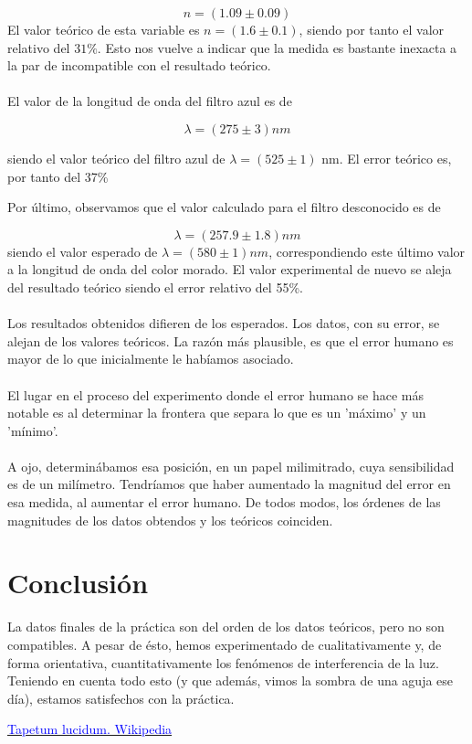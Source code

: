 \documentclass[11pt,letterpaper,twocolumn]{article}
\begin{document}
\begin{equation}
	\boxed{n=\left( 1.09 \pm 0.09 \right) }
\end{equation}
El valor teórico de esta variable es $n=(1.6 \pm 0.1)$, siendo por tanto el valor relativo del  $31\%$. Esto nos vuelve a indicar que la medida es bastante inexacta a la par de incompatible con el resultado teórico. \\
\\
El valor de la longitud de onda del filtro azul es de 

\begin{equation}
	\boxed{\lambda=(275\pm 3)nm}
\end{equation}

siendo el valor teórico del filtro azul de $\lambda=(525\pm 1)$ nm. El error teórico es, por tanto del 37\%

Por último, observamos que el valor calculado para el filtro desconocido es de 

\begin{equation}
	\boxed{\lambda=\left( 257.9 \pm 1.8 \right) nm}
\end{equation}
siendo el valor esperado de $\lambda=\left( 580\pm 1\right) nm$, correspondiendo este último valor a la longitud de onda del color morado. El valor experimental de nuevo se aleja del resultado teórico siendo el error relativo del 55\%.\\
\\
Los resultados obtenidos difieren de los esperados. Los datos, con su error, se alejan de los valores teóricos. La razón más plausible, es que el error humano es mayor de lo que inicialmente le habíamos asociado.\\
\\
El lugar en el proceso del experimento donde el error humano se hace más notable es al determinar la frontera que separa lo que es un 'máximo' y un 'mínimo'.\\
\\
A ojo, determinábamos esa posición, en un papel milimitrado, cuya sensibilidad es de un milímetro. Tendríamos que haber aumentado la magnitud del error en esa medida, al aumentar el error humano. De todos modos, los órdenes de las magnitudes de los datos obtendos y los teóricos coinciden.
\section{Conclusión}%
La datos finales de la práctica son del orden de los datos teóricos, pero no son compatibles. A pesar de ésto, hemos experimentado de cualitativamente y, de forma orientativa, cuantitativamente los fenómenos de interferencia de la luz. Teniendo en cuenta todo esto (y que además, vimos la sombra de una aguja ese día), estamos satisfechos con la práctica.
\begin{thebibliography}{0}
	 \href{https://en.wikipedia.org/wiki/Tapetum_lucidum}{\textcolor{blue}{Tapetum lucidum. Wikipedia }} 
\end{thebibliography}
\end{document}
